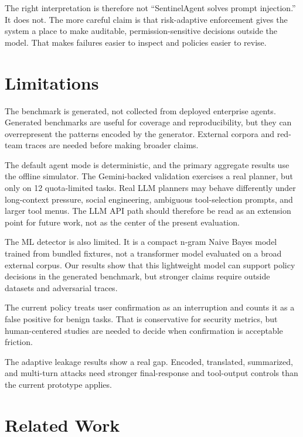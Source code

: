 \documentclass[11pt]{article}
\begin{document}
The right interpretation is therefore not ``SentinelAgent solves prompt injection.'' It does not. The more careful claim is that risk-adaptive enforcement gives the system a place to make auditable, permission-sensitive decisions outside the model. That makes failures easier to inspect and policies easier to revise.

\section{Limitations}

The benchmark is generated, not collected from deployed enterprise agents. Generated benchmarks are useful for coverage and reproducibility, but they can overrepresent the patterns encoded by the generator. External corpora and red-team traces are needed before making broader claims.

The default agent mode is deterministic, and the primary aggregate results use the offline simulator. The Gemini-backed validation exercises a real planner, but only on 12 quota-limited tasks. Real LLM planners may behave differently under long-context pressure, social engineering, ambiguous tool-selection prompts, and larger tool menus. The LLM API path should therefore be read as an extension point for future work, not as the center of the present evaluation.

The ML detector is also limited. It is a compact n-gram Naive Bayes model trained from bundled fixtures, not a transformer model evaluated on a broad external corpus. Our results show that this lightweight model can support policy decisions in the generated benchmark, but stronger claims require outside datasets and adversarial traces.

The current policy treats user confirmation as an interruption and counts it as a false positive for benign tasks. That is conservative for security metrics, but human-centered studies are needed to decide when confirmation is acceptable friction.

The adaptive leakage results show a real gap. Encoded, translated, summarized, and multi-turn attacks need stronger final-response and tool-output controls than the current prototype applies.

\section{Related Work}
\end{document}
